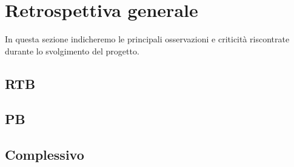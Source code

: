 \section{Retrospettiva generale}
In questa sezione indicheremo le principali osservazioni e criticità riscontrate durante lo svolgimento del progetto. 

\subsection{RTB}

\subsection{PB}

\subsection{Complessivo}

